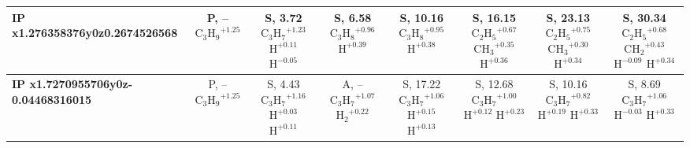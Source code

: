 \begin{table}[t]
\begin{tabular}{lccccccc}
\midrule
\textbf{IP x1.276358376y0z0.2674526568} & \makecell{P, -- \\ $\mathrm{C_3H_9}^{+1.25}$} & \makecell{S, 3.72 \\ $\mathrm{C_3H_7}^{+1.23}$ \\ $\mathrm{H}^{+0.11}$ \\ $\mathrm{H}^{-0.05}$} & \makecell{S, 6.58 \\ $\mathrm{C_3H_8}^{+0.96}$ \\ $\mathrm{H}^{+0.39}$} & \makecell{S, 10.16 \\ $\mathrm{C_3H_8}^{+0.95}$ \\ $\mathrm{H}^{+0.38}$} & \makecell{S, 16.15 \\ $\mathrm{C_2H_5}^{+0.67}$ \\ $\mathrm{CH_3}^{+0.35}$ \\ $\mathrm{H}^{+0.36}$} & \makecell{S, 23.13 \\ $\mathrm{C_2H_5}^{+0.75}$ \\ $\mathrm{CH_3}^{+0.30}$ \\ $\mathrm{H}^{+0.34}$} & \makecell{S, 30.34 \\ $\mathrm{C_2H_5}^{+0.68}$ \\ $\mathrm{CH_2}^{+0.43}$ \\ $\mathrm{H}^{-0.09}$ \\ $\mathrm{H}^{+0.34}$} \\
\midrule
\textbf{IP x1.7270955706y0z-0.04468316015} & \makecell{P, -- \\ $\mathrm{C_3H_9}^{+1.25}$} & \makecell{S, 4.43 \\ $\mathrm{C_3H_7}^{+1.16}$ \\ $\mathrm{H}^{+0.03}$ \\ $\mathrm{H}^{+0.11}$} & \makecell{A, -- \\ $\mathrm{C_3H_7}^{+1.07}$ \\ $\mathrm{H_2}^{+0.22}$} & \makecell{S, 17.22 \\ $\mathrm{C_3H_7}^{+1.06}$ \\ $\mathrm{H}^{+0.15}$ \\ $\mathrm{H}^{+0.13}$} & \makecell{S, 12.68 \\ $\mathrm{C_3H_7}^{+1.00}$ \\ $\mathrm{H}^{+0.12}$ \\ $\mathrm{H}^{+0.23}$} & \makecell{S, 10.16 \\ $\mathrm{C_3H_7}^{+0.82}$ \\ $\mathrm{H}^{+0.19}$ \\ $\mathrm{H}^{+0.33}$} & \makecell{S, 8.69 \\ $\mathrm{C_3H_7}^{+1.06}$ \\ $\mathrm{H}^{-0.03}$ \\ $\mathrm{H}^{+0.33}$} \\

\end{tabular}
\end{table}
